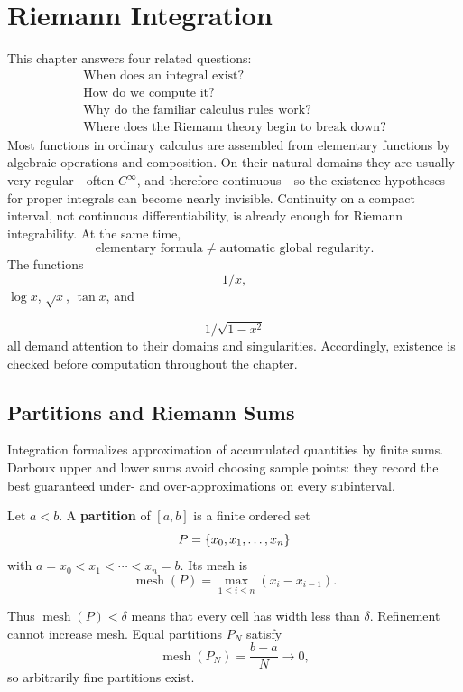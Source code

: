 \chapter{Riemann Integration}
\label{ch:riemann}

This chapter answers four related questions:
\[
\boxed{
\begin{array}{c}
\text{When does an integral exist?}\\
\text{How do we compute it?}\\
\text{Why do the familiar calculus rules work?}\\
\text{Where does the Riemann theory begin to break down?}
\end{array}}
\]
Most functions in ordinary calculus are assembled from elementary functions
by algebraic operations and composition. On their natural domains they are
usually very regular---often \(C^\infty\), and therefore continuous---so the
existence hypotheses for proper integrals can become nearly invisible.
Continuity on a compact interval, not continuous differentiability, is already
enough for Riemann integrability. At the same time,
\[
\boxed{\text{elementary formula}\ne\text{automatic global regularity}.}
\]
The functions
\[
1/x,
\]
 \(\log x\), \(\sqrt{x}\), \(\tan x\), and

\[
1/\sqrt{1-x^2}
\]
 all demand attention to their domains and singularities.
Accordingly, existence is checked before computation throughout the chapter.

\section{Partitions and Riemann Sums}

Integration formalizes approximation of accumulated quantities by finite
sums.  Darboux upper and lower sums avoid choosing sample points: they record
the best guaranteed under- and over-approximations on every subinterval.

\begin{definition}[Partition]
Let $a<b$. A \textbf{partition} of $[a,b]$ is a finite ordered set
\[
P=\left\{x_0,x_1,\ldots,x_n\right\}
\]
with $a=x_0<x_1<\cdots<x_n=b$. Its mesh is
\[
\operatorname{mesh}(P)=\max_{1\leq i\leq n}(x_i-x_{i-1}).
\]
\end{definition}
Thus $\operatorname{mesh}(P)<\delta$ means that every cell has width less
than $\delta$. Refinement cannot increase mesh. Equal partitions $P_N$
satisfy
\[
\operatorname{mesh}(P_N)=\frac{b-a}{N}\longrightarrow0,
\]
so arbitrarily fine partitions exist.

